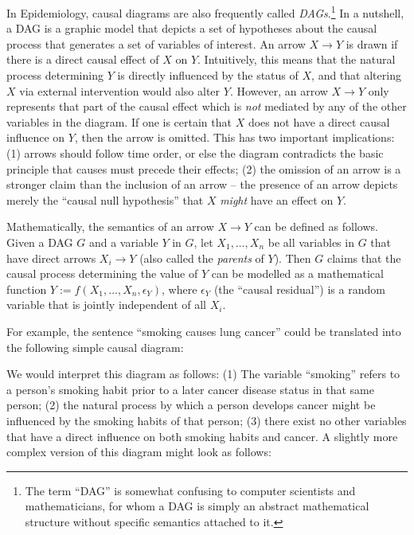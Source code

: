 \documentclass[a4paper]{article} %
\begin{document}
In Epidemiology, causal diagrams are also frequently
called \emph{DAGs}.\footnote{The term ``DAG'' is
somewhat confusing to computer scientists and mathematicians, 
for whom a DAG is simply an abstract mathematical structure without specific semantics 
attached to it.} In a nutshell, a DAG is a graphic model that depicts a set of hypotheses
about the causal process that generates a set of variables of interest.
An arrow $X \to Y$ is drawn if there is a direct
causal effect of $X$ on $Y$. Intuitively, this means that
the natural process determining $Y$ is directly influenced by
the status of $X$, and that altering $X$ via external intervention 
would also alter $Y$. However, an arrow $X \to Y$ only represents that part
of the causal effect which is \emph{not} mediated by any of the other variables
in the diagram. If one is certain that $X$ does not
have a direct causal influence on $Y$, then the arrow is omitted.
This has two important implications: (1) arrows should follow time order,
 or else the diagram contradicts the basic principle that
causes must precede their effects; (2) the omission of an arrow is a stronger
claim than the inclusion of an arrow -- the presence of an arrow depicts
merely the ``causal null hypothesis'' that $X$ \emph{might} have an effect
on $Y$.

Mathematically, the semantics of an arrow $X \to Y$ can be defined as
follows. Given a DAG $G$ and a variable $Y$ in $G$, let $X_1,\ldots,X_n$
be all variables in $G$ that have direct arrows $X_i \to Y$ (also called the
\emph{parents} of $Y$). Then $G$ 
claims that the causal process determining the value of $Y$ can be
modelled as a mathematical function $Y := f(X_1,\ldots,X_n,\epsilon_Y)$,
where $\epsilon_Y$ (the ``causal residual'') is a random variable that
is jointly independent of all $X_i$.  

For example, the sentence ``smoking causes lung cancer'' could be translated
into the following simple causal diagram: 

\begin{center}
\end{center}

We would interpret this diagram as
follows: (1) The variable ``smoking'' refers to a person's smoking habit
prior to a later cancer disease status in that same person;
(2) the natural process by which a person develops
cancer might be influenced by the smoking habits of that person; (3) there
exist no other variables that have a direct influence on both smoking 
habits and cancer. A slightly more complex version of this diagram might look as follows:
\end{document}
